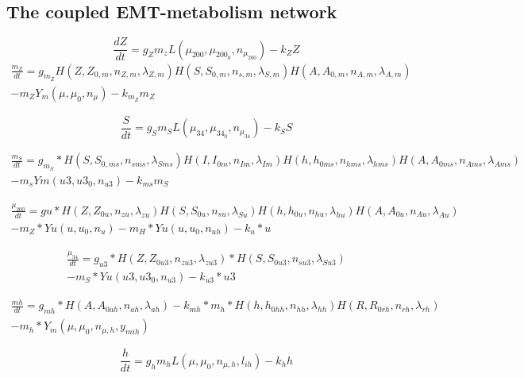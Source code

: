 \documentclass{article}
\begin{document}
\subsection{The coupled EMT-metabolism network}
\begin{equation}
\frac{dZ}{dt} = g_Z m_z L(\mu_{200},\mu_{200_{0}},n_{\mu_{200}})-k_Z Z 
\end{equation}
\begin{multline}
\frac{m_Z}{dt} = g_{m_Z} H(Z,Z_{0,m},n_{Z,m},\lambda_{Z,m}) H(S,S_{0,m},n_{s,m},\lambda_{S,m}) H(A,A_{0,m},n_{A,m},\lambda_{A,m})\\ - m_Z Y_m(\mu,\mu_0,n_\mu) - k_{m_Z} m_Z
\end{multline}

\begin{equation}
\frac{S}{dt}=g_S m_S L(\mu_{34},\mu_{34_0},n_{\mu_{34}})-k_S S 
\end{equation}

\begin{multline}
\frac{m_S}{dt}= g_{m_S}*H(S,S_{0,ms}, n_{sms}, \lambda_{Sms}) H(I,I_{0m},n_{Im},\lambda_{Im}) H(h,h_{0ms}, n_{hms},\lambda_{hms}) H(A,A_{0ms},n_{Ams},\lambda_{Ams})\\-m_s Ym(u3,u3_0,n_{u3})-k_{ms} m_S
\end{multline}

\begin{multline}
\frac{\mu_{200}}{dt}=gu*H(Z,Z_{0u},n_{zu}, \lambda_{zu}) H(S,S_{0u},n_{su},\lambda_{Su}) H(h,h_{0u},n_{hu},\lambda_{hu}) H(A,A_{0u},n_{Au},\lambda_{Au})\\ -m_Z*Yu(u,u_0,n_u)-m_H*Yu(u,u_0,n_{uh})-k_u*u
\end{multline}

\begin{multline}
\frac{\mu_{34}}{dt}= g_{u3}*H(Z,Z_{0u3},n_{zu3},\lambda_{zu3})*H(S,S_{0u3},n_{su3},\lambda_{Su3})\\-m_S*Yu(u3,u3_0,n_{u3})-k_{u3}*u3
\end{multline}

\begin{multline}
  \frac{mh}{dt}= g_{mh}*H(A,A_{0ah},n_{ah},\lambda_{ah}) - k_{mh}* m_h * H(h,h_{0hh}, n_{hh}, \lambda_{hh}) H(R,R_{0rh},n_{rh},\lambda_{rh})\\-m_h*Y_m(\mu,\mu_0,n_{\mu,h},y_{mih})
\end{multline}

\begin{equation}
       \frac{h}{dt} = g_h m_h L(\mu,\mu_0,n_{\mu,h},l_{ih})-k_h h
\end{equation}
\end{document}
